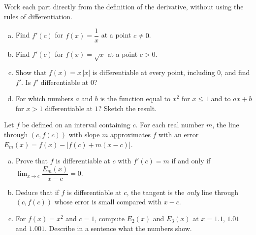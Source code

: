 \begin{problem}
Work each part directly from the definition of the derivative, without using the rules of differentiation.
\begin{enumerate}[(a)]
	\item Find $f'(c)$ for $f(x) = \dfrac1x$ at a point $c \neq 0$.
	\item Find $f'(c)$ for $f(x) = \sqrt{x}$ at a point $c > 0$.
	\item Show that $f(x) = x\,|x|$ is differentiable at every point, including $0$, and find $f'$.  Is $f'$ differentiable at $0$?
	\item For which numbers $a$ and $b$ is the function equal to $x^2$ for $x \leq 1$ and to $ax + b$ for $x > 1$ differentiable at $1$?  Sketch the result.
\end{enumerate}
\end{problem}

\begin{problem}
Let $f$ be defined on an interval containing $c$.  For each real number $m$, the line through $(c, f(c))$ with slope $m$ approximates $f$ with an error $E_m(x) = f(x) - \big[f(c) + m(x - c)\big]$.
\begin{enumerate}[(a)]
	\item Prove that $f$ is differentiable at $c$ with $f'(c) = m$ if and only if $\lim_{x \to c} \dfrac{E_m(x)}{x - c} = 0$.
	\item Deduce that if $f$ is differentiable at $c$, the tangent is the \emph{only} line through $(c, f(c))$ whose error is small compared with $x - c$.
	\item For $f(x) = x^2$ and $c = 1$, compute $E_2(x)$ and $E_3(x)$ at $x = 1.1$, $1.01$ and $1.001$.  Describe in a sentence what the numbers show.
\end{enumerate}
\end{problem}

